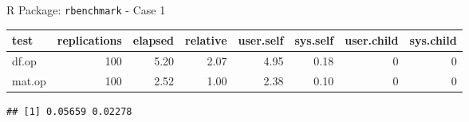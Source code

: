 \begin{frame}[fragile]{R Package: \texttt{rbenchmark} - Case 1}

\begin{Shaded}
\begin{Highlighting}[]
\NormalTok{(}\NormalTok{)}

\StringTok{ }\NormalTok{(} 
                 
\end{Highlighting}
\end{Shaded}

\begin{Shaded}
\begin{Highlighting}[]
\end{Highlighting}
\end{Shaded}

\begin{longtable}[c]{@{}lrrrrrrr@{}}
\toprule
test & replications & elapsed & relative & user.self & sys.self &
user.child & sys.child\tabularnewline
\midrule
\endhead
df.op & 100 & 5.20 & 2.07 & 4.95 & 0.18 & 0 & 0\tabularnewline
mat.op & 100 & 2.52 & 1.00 & 2.38 & 0.10 & 0 & 0\tabularnewline
\bottomrule
\end{longtable}

\begin{Shaded}
\begin{Highlighting}[]
\NormalTok{out[,}\NormalTok{]/out[,}\NormalTok{]}
\end{Highlighting}
\end{Shaded}

\begin{verbatim}
## [1] 0.05659 0.02278
\end{verbatim}

\end{frame}

